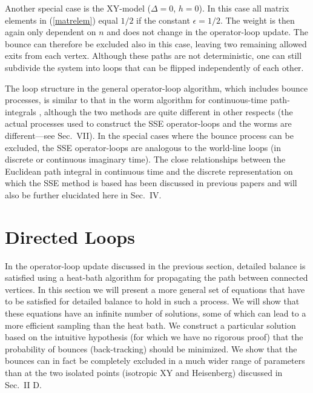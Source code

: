 \documentclass[10pt,pre,aps,twocolumn,showpacs,superscriptaddress,
floatfix]{revtex4}
\begin{document}
Another special case is the XY-model \cite{sse3,ssexy} ($\Delta=0$, $h=0$). 
In this case all matrix elements in (\ref{matrelem}) equal $1/2$ if
the constant $\epsilon=1/2$. The weight is then again only dependent on $n$ 
and does not change in the operator-loop update. The bounce can therefore be 
excluded also in this case, leaving two remaining allowed exits from each 
vertex. Although these paths are not deterministic, one can still subdivide 
the system into loops that can be flipped independently of each other.

The loop structure in the general operator-loop algorithm, which includes
bounce processes, is similar to that in the worm algorithm for continuous-time 
path-integrals \cite{prokofev}, although the two methods are quite different 
in other respects (the actual processes used to construct the SSE 
operator-loops and the worms are different---see Sec.~VII). In the special 
cases where the bounce process can be excluded, the SSE operator-loops are 
analogous to the world-line loops (in discrete \cite{evertz} or continuous 
\cite{beard,syljuasen} imaginary time). The close relationships between the 
Euclidean path integral in continuous time and the discrete representation 
on which the SSE method is based has been discussed in previous papers
\cite{sse2,irsse,athens} and will also be further elucidated here in Sec.~IV. 

\section{Directed Loops \label{DLsection}}

In the operator-loop update discussed in the previous section, detailed 
balance is satisfied using a heat-bath algorithm for propagating the path 
between connected vertices. In this section we will present a more general set
of equations that have to be satisfied for detailed balance to hold in such a 
process. We will show that these equations have an infinite number of 
solutions, some of which can lead to a more efficient sampling than the heat 
bath. We construct a particular solution based on the intuitive hypothesis 
(for which we have no rigorous proof) 
that the probability of bounces (back-tracking) 
should be minimized. We show that the bounces can in fact be completely 
excluded in a much wider range of parameters than at the two isolated points 
(isotropic XY and Heisenberg) discussed in Sec.~II D. 
\end{document}
